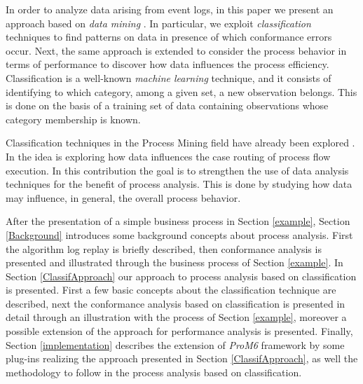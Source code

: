 \documentclass{llncs}
\begin{document}
In order to analyze data arising from event logs, in this paper we present an approach based on \emph{data mining} \cite{5}. In particular, we exploit \emph{classification} techniques to find patterns on data in presence of which conformance errors occur. Next, the same approach is extended to consider the process behavior in terms of performance to discover how data influences the process efficiency. Classification is a well-known \emph{machine learning} technique, and it consists of identifying to which category, among a given set, a new observation belongs. This is done on the basis of a training set of data containing observations whose category membership is known.

Classification techniques in the Process Mining field have already been explored \cite{1}\cite{14}. In \cite{1} the idea is exploring how data influences the case routing of process flow execution. In this contribution the goal is to strengthen the use of data analysis techniques for the benefit of process analysis. This is done by studying how data may influence, in general, the overall process behavior.

After the presentation of a simple business process in Section \ref{example}, Section \ref{Background} introduces some background concepts about process analysis. First the algorithm log replay is briefly described, then conformance analysis is presented and illustrated through the business process of Section \ref{example}. In Section \ref{ClassifApproach} our approach to process analysis based on classification is presented. First a few basic concepts about the classification technique are described, next the conformance analysis based on classification is presented in detail through an illustration with the process of Section \ref{example}, moreover a possible extension of the approach for performance analysis is presented. Finally, Section \ref{implementation} describes the extension of \emph{ProM6}\cite{6} framework by some plug-ins realizing the approach presented in Section \ref{ClassifApproach}, as well the methodology to follow in the process analysis based on classification.
\end{document}
